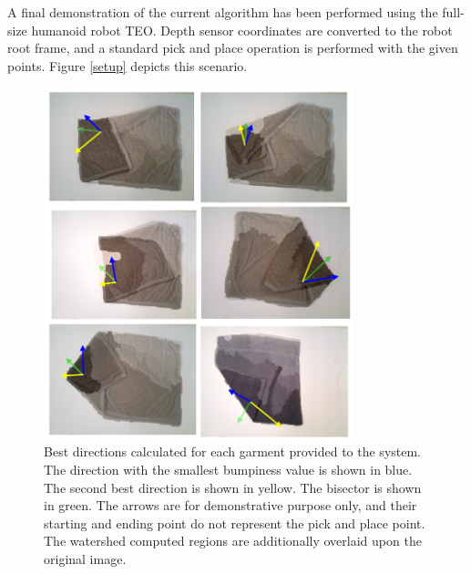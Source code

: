 
A final demonstration of the current algorithm has been performed using the full-size humanoid robot TEO. Depth sensor coordinates are converted to the robot root frame, and a standard pick and place operation is performed with the given points. Figure \ref{setup} depicts this scenario.



\begin{figure}[thpb]
    \centering
    \includegraphics[width=0.8\textwidth]{figures/directions_several.png}
    \caption{Best directions calculated for each garment provided to the system. The direction with the smallest bumpiness value is shown in blue. The second best direction is shown in yellow. The bisector is shown in green. The arrows are for demonstrative purpose only, and their starting and ending point do not represent the pick and place point. The watershed computed regions are additionally overlaid upon the original image.}
    \label{directions_several}
\end{figure}
